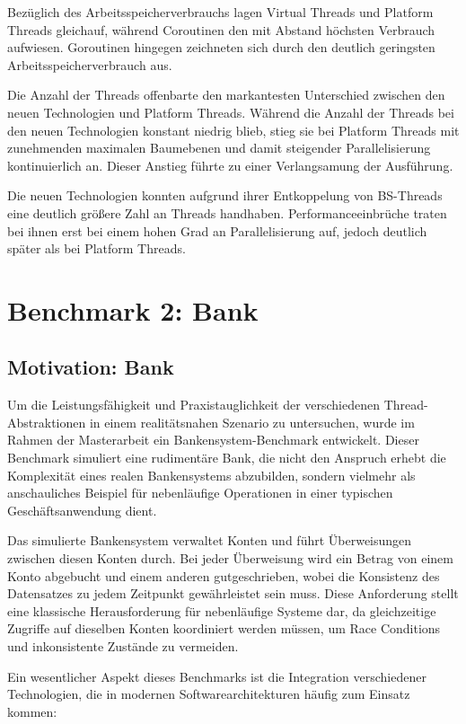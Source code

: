 \documentclass[fontsize=12pt,paper=a4,twoside=semi,parskip=half-,headsepline,headinclude]{scrreprt}
\begin{document}
Bezüglich des Arbeitsspeicherverbrauchs lagen Virtual Threads und Platform Threads gleichauf, während Coroutinen den mit Abstand höchsten Verbrauch aufwiesen. Goroutinen hingegen zeichneten sich durch den deutlich geringsten Arbeitsspeicherverbrauch aus.

Die Anzahl der Threads offenbarte den markantesten Unterschied zwischen den neuen Technologien und Platform Threads. Während die Anzahl der Threads bei den neuen Technologien konstant niedrig blieb, stieg sie bei Platform Threads mit zunehmenden maximalen Baumebenen und damit steigender Parallelisierung kontinuierlich an. Dieser Anstieg führte zu einer Verlangsamung der Ausführung.

Die neuen Technologien konnten aufgrund ihrer Entkoppelung von BS-Threads eine deutlich größere Zahl an Threads handhaben. Performanceeinbrüche traten bei ihnen erst bei einem  hohen Grad an Parallelisierung auf, jedoch deutlich später als bei Platform Threads.

\newpage

\section{Benchmark 2: Bank}

\subsection{Motivation: Bank}

Um die Leistungsfähigkeit und Praxistauglichkeit der verschiedenen Thread-Abs\-trak\-tio\-nen in einem realitätsnahen Szenario zu untersuchen, wurde im Rahmen der Masterarbeit ein Bankensystem-Bench\-mark entwickelt. Dieser Benchmark simuliert eine rudimentäre Bank, die nicht den Anspruch erhebt die Komplexität eines realen Bankensystems abzubilden, sondern vielmehr als anschauliches Beispiel für nebenläufige Operationen in einer typischen Ge\-schäfts\-an\-wen\-dung dient.

Das simulierte Bankensystem verwaltet Konten und führt Überweisungen zwischen diesen Konten durch. Bei jeder Überweisung wird ein Betrag von einem Konto abgebucht und einem anderen gutgeschrieben, wobei die Konsistenz des Datensatzes zu jedem Zeitpunkt gewährleistet sein muss. Diese Anforderung stellt eine klassische Herausforderung für nebenläufige Systeme dar, da gleichzeitige Zugriffe auf dieselben Konten koordiniert werden müssen, um Race Conditions und inkonsistente Zustände zu vermeiden.

Ein wesentlicher Aspekt dieses Benchmarks ist die Integration verschiedener Technologien, die in modernen Softwarearchitekturen häufig zum Einsatz kommen:
\end{document}
